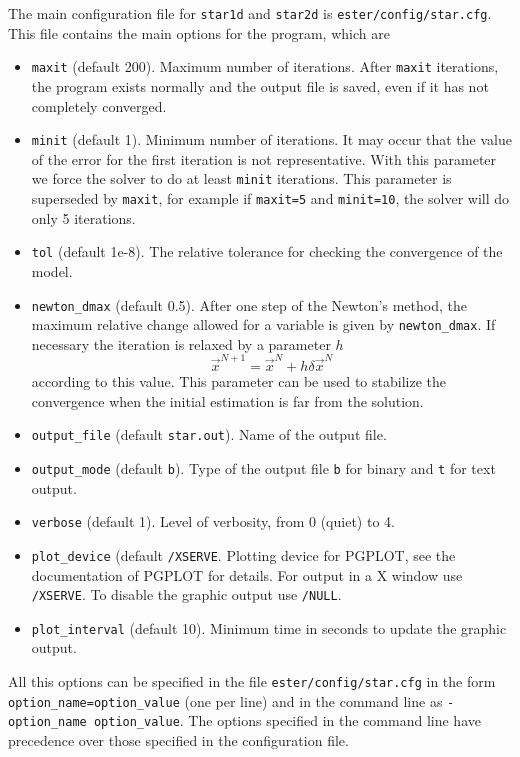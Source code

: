 The main configuration file for {\tt star1d} and {\tt star2d} is {\tt ester/config/star.cfg}.
This file contains the main options for the program, which are
\begin{itemize}
\item {\tt maxit} (default 200).
Maximum number of iterations. After {\tt maxit} iterations, the program
exists normally and the output file is saved, even if it has not completely converged.
\item {\tt minit} (default 1).
Minimum number of iterations. It may occur that the value of the error
for the first iteration is not representative. With this parameter we force the solver to
do at least {\tt minit} iterations. This parameter is superseded by {\tt maxit}, for example
if {\tt maxit=5} and {\tt minit=10}, the solver will do only 5 iterations.
\item {\tt tol} (default 1e-8). 
The relative tolerance for checking the convergence of the model.
\item {\tt newton\_dmax} (default 0.5).
After one step of the Newton's method, the maximum relative change
allowed for a variable is given by {\tt newton\_dmax}. If necessary the iteration is relaxed
by a parameter $h$
$$\vec x^{N+1}=\vec x^N+h \delta\vec x^N$$
according to this value.
This parameter can be used to stabilize the convergence when the initial estimation is far
from the solution.
\item {\tt output\_file} (default {\tt star.out}). Name of the output file.
\item {\tt output\_mode} (default {\tt b}). Type of the output file {\tt b} for binary
and {\tt t} for text output.
\item {\tt verbose} (default 1). Level of verbosity, from 0 (quiet) to 4.
\item {\tt plot\_device} (default {\tt /XSERVE}. Plotting device for PGPLOT, 
see the documentation of PGPLOT for details. For output in a X window use {\tt /XSERVE}.
To disable the graphic output use {\tt /NULL}.
\item {\tt plot\_interval} (default 10). Minimum time in seconds to update the graphic output.
\end{itemize}
All this options can be specified in the file {\tt ester/config/star.cfg} in the form
{\tt option\_name=option\_value} (one per line) and in the command line as 
{\tt -option\_name option\_value}. The options specified in the command line have precedence
over those specified in the configuration file. 

